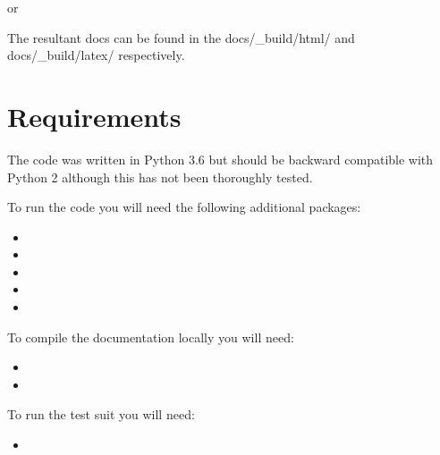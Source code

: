 \documentclass[letterpaper,10pt,english]{sphinxmanual}
\begin{document}
or

\begin{sphinxVerbatim}[commandchars=\\\{\}]
 
 
\end{sphinxVerbatim}

The resultant docs can be found in the docs/\_build/html/ and docs/\_build/latex/
respectively.


\section{Requirements}
\label{\detokenize{source/intro:requirements}}
The code was written in Python 3.6 but should be backward compatible with
Python 2 although this has not been thoroughly tested.

To run the code you will need the following additional packages:
\begin{itemize}
\item {} 

\item {} 

\item {} 

\item {} 

\item {} 

\end{itemize}

To compile the documentation locally you will need:
\begin{itemize}
\item {} 

\item {} 

\end{itemize}

To run the test suit you will need:
\begin{itemize}
\item {} 

\end{itemize}
\end{document}
